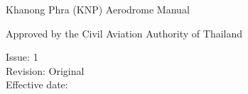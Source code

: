 \vspace{5cm}
Khanong Phra (KNP) Aerodrome Manual 

Approved by the Civil Aviation Authority of Thailand




Issue: 1 \\
Revision: Original \\
Effective date:

